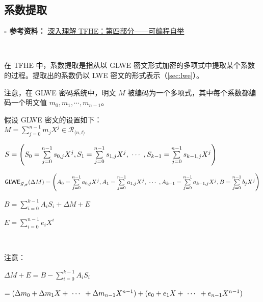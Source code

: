 \subsection{系数提取}
\label{subsec:tfhe-extraction}

\textbf{- 参考资料：}
\href{https://www.zama.ai/post/tfhe-deep-dive-part-4}{深入理解 TFHE：第四部分——可编程自举}~\cite{tfhe-4}

$ $

在 TFHE 中，系数提取是指从以 GLWE 密文形式加密的多项式中提取某个系数的过程。提取出的系数仍以 LWE 密文的形式表示（\autoref{sec:lwe}）。 %



注意，在 GLWE 密码系统中，明文 $M$ 被编码为一个多项式，其中每个系数都编码一个明文值 $m_0, m_1, \cdots, m_{n-1}$。


假设 GLWE 密文的设置如下： \\
$M = \sum\limits_{j=0}^{n-1}m_jX^j \in \mathcal{R}_{\langle n, t \rangle}$

$S = \left(S_0 = \sum\limits_{j=0}^{n-1}s_{0,j}X^j, S_1 = \sum\limits_{j=0}^{n-1}s_{1,j}X^j, \text{ } \text{$\cdots$} \text{ }, S_{k-1} = \sum\limits_{j=0}^{n-1}s_{k-1,j}X^j \right)$ 

$\textsf{GLWE}_{\vec{S}, \sigma}(\Delta M) = \left(A_0 = \sum\limits_{j=0}^{n-1}a_{0,j}X^j, A_1 = \sum\limits_{j=0}^{n-1}a_{1,j}X^j, \text{ } \text{$\cdots$} \text{ }, A_{k-1} = \sum\limits_{j=0}^{n-1}a_{k-1,j}X^j, B = \sum\limits_{j=0}^{n-1}b_{j}X^j\right)$ 

$B = \sum\limits_{i=0}^{k-1}A_iS_i + \Delta M + E$ 

$E = \sum\limits_{i=0}^{n-1}e_iX^i$ 

$ $

\noindent 注意：

$\Delta M + E = B - \sum\limits_{i=0}^{k-1}A_iS_i$ 

$ = (\Delta m_0 + \Delta m_1X + \text{ } \text{$\cdots$} \text{ } + \Delta m_{n-1}X^{n-1}) + (e_0 + e_1X + \text{ } \text{$\cdots$} \text{ } + e_{n-1}X^{n-1})$

